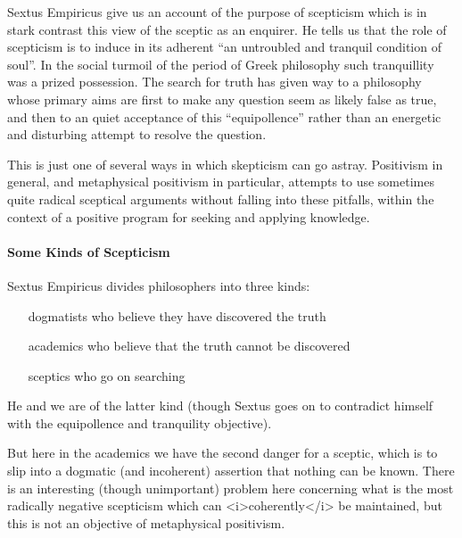 \documentclass{rbjk}
\begin{document}
\begin{article}
Sextus Empiricus give us an account of the purpose of scepticism which is in stark contrast this view of the sceptic as an enquirer.
He tells us that the role of scepticism is to induce in its adherent ``an untroubled and tranquil condition of soul''.
In the social turmoil of the period of Greek philosophy such tranquillity was a prized possession.
The search for truth has given way to a philosophy whose primary aims are first to make any question seem as likely false as true, and then to an quiet acceptance of this ``equipollence'' rather than an energetic and disturbing attempt to resolve the question.

This is just one of several ways in which skepticism can go astray.
Positivism in general, and metaphysical positivism in particular, attempts to use sometimes quite radical sceptical arguments without falling into these pitfalls, within the context of a positive program for seeking and applying knowledge.

\paragraph{Some Kinds of Scepticism}

Sextus Empiricus divides philosophers into three kinds:

\begin{itemize}
\item[dogmatists] who believe they have discovered the truth
\item[academics] who believe that the truth cannot be discovered
\item[sceptics] who go on searching
\end{itemize}

He and we are of the latter kind (though Sextus goes on to contradict himself with the equipollence and tranquility objective).

But here in the academics we have the second danger for a sceptic, which is to slip into a dogmatic (and incoherent) assertion that nothing can be known.
There is an interesting (though unimportant) problem here concerning what is the most radically negative scepticism which can <i>coherently</i> be maintained, but this is not an objective of metaphysical positivism.


%
%

\end{article}
\end{document}
